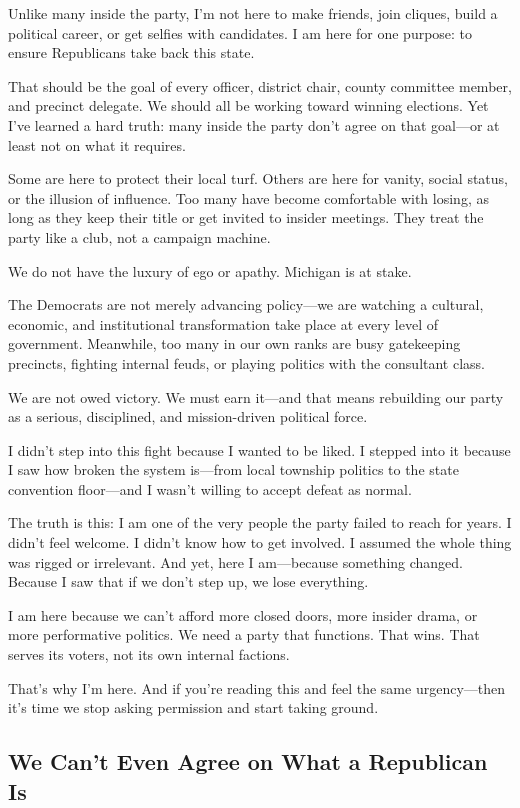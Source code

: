 Unlike many inside the party, I’m not here to make friends, join cliques, build a political career, or get selfies with candidates. I am here for one purpose: to ensure Republicans take back this state.

That should be the goal of every officer, district chair, county committee member, and precinct delegate. We should all be working toward winning elections. Yet I’ve learned a hard truth: many inside the party don’t agree on that goal—or at least not on what it requires.

Some are here to protect their local turf. Others are here for vanity, social status, or the illusion of influence. Too many have become comfortable with losing, as long as they keep their title or get invited to insider meetings. They treat the party like a club, not a campaign machine.

We do not have the luxury of ego or apathy. Michigan is at stake.

The Democrats are not merely advancing policy—we are watching a cultural, economic, and institutional transformation take place at every level of government. Meanwhile, too many in our own ranks are busy gatekeeping precincts, fighting internal feuds, or playing politics with the consultant class.

We are not owed victory. We must earn it—and that means rebuilding our party as a serious, disciplined, and mission-driven political force.

I didn’t step into this fight because I wanted to be liked. I stepped into it because I saw how broken the system is—from local township politics to the state convention floor—and I wasn’t willing to accept defeat as normal.

The truth is this: I am one of the very people the party failed to reach for years. I didn’t feel welcome. I didn’t know how to get involved. I assumed the whole thing was rigged or irrelevant. And yet, here I am—because something changed. Because I saw that if we don’t step up, we lose everything.

I am here because we can’t afford more closed doors, more insider drama, or more performative politics. We need a party that functions. That wins. That serves its voters, not its own internal factions.

That’s why I’m here. And if you're reading this and feel the same urgency—then it's time we stop asking permission and start taking ground.

\subsection{We Can't Even Agree on What a Republican Is}

